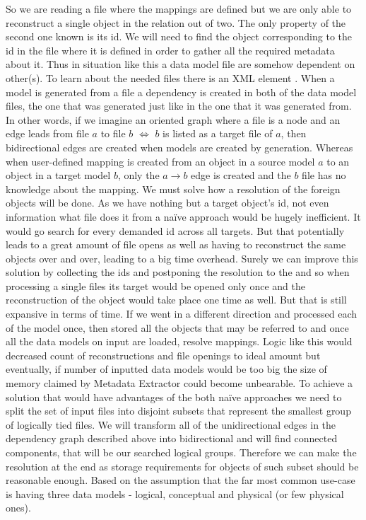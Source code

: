 So we are reading a file where the mappings are defined but we are only able to reconstruct a single object in the relation out of two. 
The only property of the second one known is its id. We will need to find the object corresponding to the id in the file where it is defined in order to gather all the required metadata about it.
Thus in situation like this a data model file are somehow dependent on other(s).
To learn about the needed files there is an XML element .
When a model is generated from a file a dependency is created in both of the data model files, the one that was generated just like in the one that it was generated from. In other words, if we imagine an oriented graph where a file is a node and an edge leads from file $a$ to file $b$ $\iff$ $b$ is listed as a target file of $a$, then bidirectional edges are created when models are created by generation.
Whereas when user-defined mapping is created from an object in a source model $a$ to an object in a target model $b$, only the $a \rightarrow b$ edge is created and the $b$ file has no knowledge about the mapping.
We must solve how a resolution of the foreign objects will be done. As we have nothing but a target object's id, not even information what file does it from a naïve approach would be hugely inefficient. 
It would go search for every demanded id across all targets. 
But that potentially leads to a great amount of file opens as well as having to reconstruct the same objects over and over, leading to a big time overhead.
Surely we can improve this solution by collecting the ids and postponing the resolution to the and so when processing a single files its target would be opened only once and the reconstruction of the object would take place one time as well. But that is still expansive in terms of time.
If we went in a different direction and processed each of the model once, then stored all the objects that may be referred to and once all the data models on input are loaded, resolve mappings. Logic like this would decreased count of reconstructions and file openings to ideal amount but eventually, if number of inputted data models would be too big the size of memory claimed by Metadata Extractor could become unbearable.
To achieve a solution that would have advantages of the both naïve approaches we need to split the set of input files into disjoint subsets that represent the smallest group of logically tied files. We will transform all of the unidirectional edges in the dependency graph described above into bidirectional and will find connected components, that will be our searched logical groups. Therefore we can make the resolution at the end as storage requirements for objects of such subset should be reasonable enough. Based on the assumption that the far most common use-case is having three data models - logical, conceptual and physical (or few physical ones). \\

